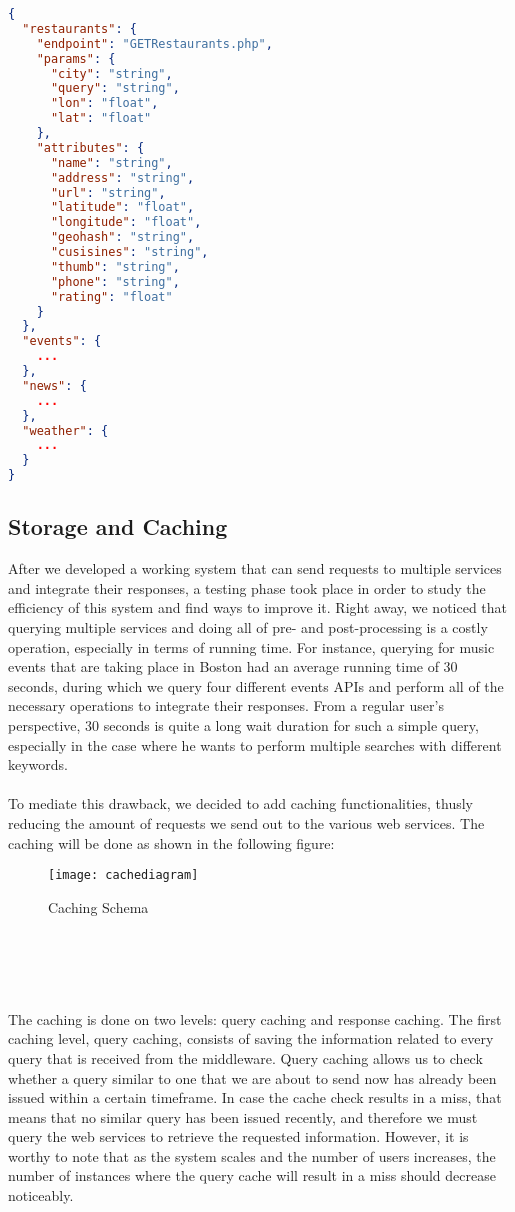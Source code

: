 \newpage
\begin{lstlisting}[language=json,firstnumber=1]
{
  "restaurants": {
    "endpoint": "GETRestaurants.php",
    "params": {
      "city": "string",
      "query": "string",
      "lon": "float",
      "lat": "float"
    },
    "attributes": {
      "name": "string",
      "address": "string",
      "url": "string",
      "latitude": "float",
      "longitude": "float",
      "geohash": "string",
      "cusisines": "string",
      "thumb": "string",
      "phone": "string",
      "rating": "float"
    }
  },
  "events": {
    ...
  },
  "news": {
    ...
  },
  "weather": {
    ...
  }
}
\end{lstlisting}
\pagebreak
\subsection{Storage and Caching}
After we developed a working system that can send requests to multiple services and integrate their responses, a testing phase took place in order to study the efficiency of this system and find ways to improve it. Right away, we noticed that querying multiple services and doing all of pre- and post-processing is a costly operation, especially in terms of running time. For instance, querying for music events that are taking place in Boston had an average running time of 30 seconds, during which we query four different events APIs and perform all of the necessary operations to integrate their responses. From a regular user's perspective, 30 seconds is quite a long wait duration for such a simple query, especially in the case where he wants to perform multiple searches with different keywords.\\\\
To mediate this drawback, we decided to add caching functionalities, thusly reducing the amount of requests we send out to the various web services. The caching will be done as shown in the following figure:\\
\begin{figure}[h]
\centering
\texttt{[image: cachediagram]}
\caption{Caching Schema}
\end{figure}
\\\\\\\\
The caching is done on two levels: query caching and response caching. The first caching level, query caching, consists of saving the information related to every query that is received from the middleware. Query caching allows us to check whether a query similar to one that we are about to send now has already been issued within a certain timeframe. In case the cache check results in a miss, that means that no similar query has been issued recently, and therefore we must query the web services to retrieve the requested information. However, it is worthy to note that as the system scales and the number of users increases, the number of instances where the query cache will result in a miss should decrease noticeably.\\\\
